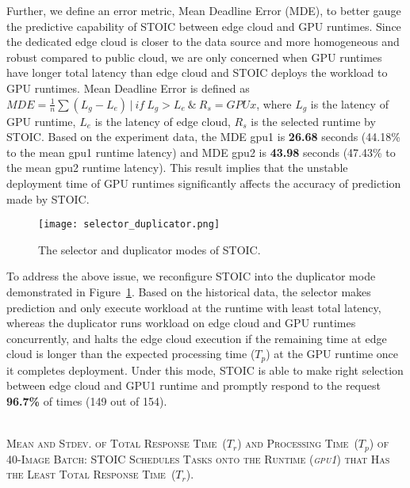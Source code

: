 Further, we define an error metric, Mean Deadline Error (MDE), to better gauge the predictive capability of STOIC between edge cloud and GPU runtimes. Since the dedicated edge cloud is closer to the data source and more homogeneous and robust compared to public cloud, we are only concerned when GPU runtimes have longer total latency than edge cloud and STOIC deploys the workload to GPU runtimes. Mean Deadline Error is defined as $MDE = \frac{1}{n}\sum(L_g - L_e) \,|\ if \ L_g > L_e \ \& \ R_s = GPUx $, where $L_g$ is the latency of GPU runtime, $L_e$ is the latency of edge cloud, $R_s$ is the selected runtime by STOIC. Based on the experiment data, the MDE gpu1 is \textbf{26.68} seconds (44.18\% to the mean gpu1 runtime latency) and MDE gpu2 is \textbf{43.98} seconds (47.43\% to the mean gpu2 runtime latency). This result implies that the unstable deployment time of GPU runtimes significantly affects the accuracy of prediction made by STOIC. 

\begin{figure}[t] \centering 
\texttt{[image: selector\_duplicator.png]}
\caption{The selector and duplicator modes of STOIC. 
\label{fig:duplicator}}
\end{figure}

To address the above issue, we reconfigure STOIC into the duplicator mode demonstrated in Figure~\ref{fig:duplicator}. Based on the historical data, the selector makes prediction and only execute workload at the runtime with least total latency, whereas the duplicator runs workload on edge cloud and GPU runtimes concurrently, and halts the edge cloud execution if the remaining time at edge cloud is longer than the expected processing time ($T_p$) at the GPU runtime once it completes deployment. Under this mode, STOIC is able to make right selection between edge cloud and GPU1 runtime and promptly respond to the request \textbf{96.7\%} of times (149 out of 154). 

\begin{table}[t] 
\centering
\captionsetup{justification=centering}
\caption{ \hspace{0pt} \\
\textsc{Mean and Stdev. of Total Response Time~($T_r$) and Processing Time~($T_p$) of 40-Image Batch: STOIC Schedules Tasks onto the Runtime (\textit{gpu1}) that Has the Least Total Response Time~($T_r$).}}


\label{tab:validation}
\end{table}


